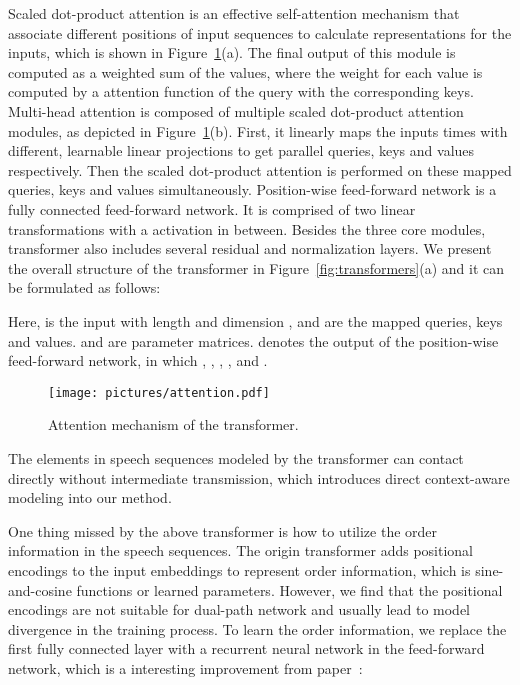 \documentclass[a4paper]{article}
\begin{document}
Scaled dot-product attention is an effective self-attention mechanism that associate different positions of input sequences to calculate representations for the inputs, which is shown in Figure~\ref{fig:attention}(a). The final output of this module is computed as a weighted sum of the values, where the weight for each value is computed by a attention function of the query with the corresponding keys. Multi-head attention is composed of multiple scaled dot-product attention modules, as depicted in Figure~\ref{fig:attention}(b). First, it linearly maps the inputs  times with different, learnable linear projections to get parallel queries, keys and values respectively. Then the scaled dot-product attention is performed on these mapped queries, keys and values simultaneously. Position-wise feed-forward network is a fully connected feed-forward network. It is comprised of two linear transformations with a  activation in between. Besides the three core modules, transformer also includes several residual and normalization layers. We present the overall structure of the transformer in Figure~\ref{fig:transformers}(a) and it can be formulated as follows:






Here,  is the input with length  and dimension , and  are the mapped queries, keys and values.  and  are parameter matrices.
 denotes the output of the position-wise feed-forward network, in which , , , , and .


\begin{figure}[t]
  \centering
  \texttt{[image: pictures/attention.pdf]}
  \caption{Attention mechanism of the transformer.}
  \label{fig:attention}
\end{figure}

The elements in speech sequences modeled by the transformer can contact directly without intermediate transmission, which introduces direct context-aware modeling into our method.

One thing missed by the above transformer is how to utilize the order information in the speech sequences. The origin transformer adds positional encodings to the input embeddings to represent order information, which is sine-and-cosine functions or learned parameters. However, we find that the positional encodings are not suitable for dual-path network and usually lead to model divergence in the training process. To learn the order information, we replace the first fully connected layer with a recurrent neural network in the feed-forward network, which is a interesting improvement from paper~\cite{sperber2018self}:
\end{document}
